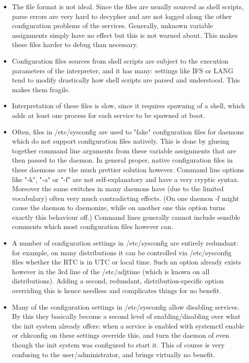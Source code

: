 \documentclass[titlepage]{article}
\begin{document}
\begin{itemize}
\item The file format is not ideal. Since the files are usually sourced as shell scripts, parse errors are very hard to decypher and are not logged along the other configuration problems of the services. Generally, unknown variable assignments simply have no effect but this is not warned about. This makes these files harder to debug than necessary.
\item Configuration files sources from shell scripts are subject to the execution parameters of the interpreter, and it has many: settings like IFS or LANG tend to modify drastically how shell scripts are parsed and understood. This makes them fragile.
\item Interpretation of these files is slow, since it requires spawning of a shell, which adds at least one process for each service to be spawned at boot.
\item Often, files in /etc/sysconfig are used to "fake" configuration files for daemons which do not support configuration files natively. This is done by glueing together command line arguments from these variable assignments that are then passed to the daemon. In general proper, native configuration files in these daemons are the much prettier solution however. Command line options like "-k", "-a" or "-f" are not self-explanatory and have a very cryptic syntax. Moreover the same switches in many daemons have (due to the limited vocabulary) often very much contradicting effects. (On one daemon -f might cause the daemon to daemonize, while on another one this option turns exactly this behaviour off.) Command lines generally cannot include sensible comments which most configuration files however can.
\item A number of configuration settings in /etc/sysconfig are entirely redundant: for example, on many distributions it can be controlled via /etc/sysconfig files whether the RTC is in UTC or local time. Such an option already exists however in the 3rd line of the /etc/adjtime (which is known on all distributions). Adding a second, redundant, distribution-specific option overriding this is hence needless and complicates things for no benefit.
\item Many of the configuration settings in /etc/sysconfig allow disabling services. By this they basically become a second level of enabling/disabling over what the init system already offers: when a service is enabled with systemctl enable or chkconfig on these settings override this, and turn the daemon of even though the init system was configured to start it. This of course is very confusing to the user/administrator, and brings virtually no benefit.

\end{itemize}
\end{document}
